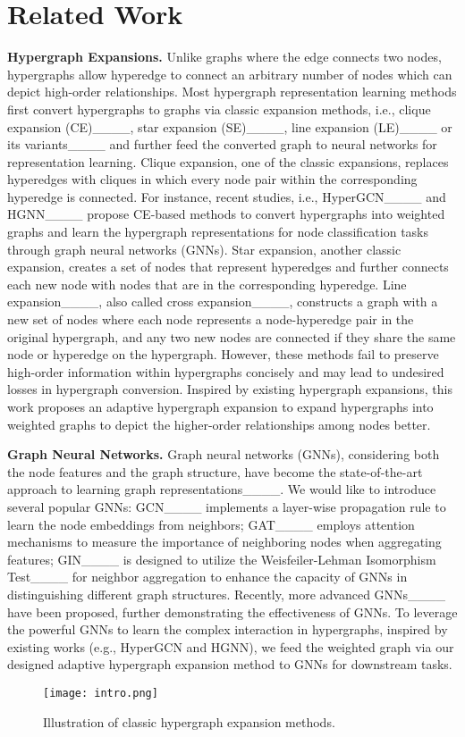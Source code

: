 \section{Related Work}
\noindent\textbf{Hypergraph Expansions.} Unlike graphs where the edge connects two nodes, hypergraphs allow hyperedge to connect an arbitrary number of nodes which can depict high-order relationships. 
Most hypergraph representation learning methods first convert hypergraphs to graphs via classic expansion methods, i.e., clique expansion (CE)____, star expansion (SE)____, 
line expansion (LE)____ 
or its variants____ and further feed the converted graph to neural networks for representation learning.
Clique expansion, one of the classic expansions, replaces hyperedges with cliques in which every node pair within the corresponding hyperedge is connected.
For instance, recent studies, i.e., HyperGCN____ and HGNN____ propose CE-based methods to convert hypergraphs into weighted graphs and learn the hypergraph representations for node classification tasks through graph neural networks (GNNs). 
Star expansion, another classic expansion, creates a set of nodes that represent hyperedges and further connects each new node with nodes that are in the corresponding hyperedge. 
Line expansion____, also called cross expansion____, constructs a graph with a new set of nodes where each node represents a node-hyperedge pair in the original hypergraph, and any two new nodes are connected if they share the same node or hyperedge on the hypergraph.
However, these methods fail to preserve high-order information within hypergraphs concisely and may lead to undesired losses in hypergraph conversion.  
Inspired by existing hypergraph expansions, this work proposes an adaptive hypergraph expansion to expand hypergraphs into weighted graphs to depict the higher-order relationships among nodes better. 

\noindent\textbf{Graph Neural Networks.}
 Graph neural networks (GNNs), considering both the node features and the graph structure, have become the state-of-the-art approach to learning graph representations____. 
 We would like to introduce several popular GNNs: GCN____ implements a layer-wise propagation rule to learn the node embeddings from neighbors;
GAT____ employs attention mechanisms to measure the importance of neighboring nodes when aggregating features;
GIN____ is designed to utilize the Weisfeiler-Lehman Isomorphism Test____ for neighbor aggregation to enhance the capacity of GNNs in distinguishing different graph structures. 
Recently, more advanced GNNs____ have been proposed, further demonstrating the effectiveness of GNNs.
 To leverage the powerful GNNs to learn the complex interaction in hypergraphs, inspired by existing works (e.g., HyperGCN and HGNN), we feed the weighted graph via our designed adaptive hypergraph expansion method to GNNs for downstream tasks. 



\begin{figure}
\vspace{-1mm}
\begin{center}
    \texttt{[image: intro.png]}
\end{center}
\vspace{-3mm}
\caption{Illustration of classic hypergraph expansion methods.}
\label{fig: intro}
\vspace{-5mm}
\end{figure}